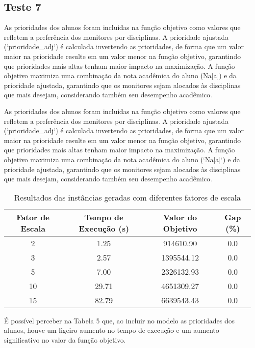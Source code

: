 \documentclass[a4paper,12pt]{article}
\begin{document}
\subsection{Teste 7}

As prioridades dos alunos foram incluídas na função objetivo como valores que refletem a preferência dos monitores por disciplinas. A prioridade ajustada (`prioridade\_adj`) é calculada invertendo as prioridades, de forma que um valor maior na prioridade resulte em um valor menor na função objetivo, garantindo que prioridades mais altas tenham maior impacto na maximização. A função objetivo maximiza uma combinação da nota acadêmica do aluno (Na[a]) e da prioridade ajustada, garantindo que os monitores sejam alocados às disciplinas que mais desejam, considerando também seu desempenho acadêmico.

As prioridades dos alunos foram incluídas na função objetivo como valores que refletem a preferência dos monitores por disciplinas. A prioridade ajustada (`prioridade\_adj`) é calculada invertendo as prioridades, de forma que um valor maior na prioridade resulte em um valor menor na função objetivo, garantindo que prioridades mais altas tenham maior impacto na maximização. A função objetivo maximiza uma combinação da nota acadêmica do aluno (`Na[a]`) e da prioridade ajustada, garantindo que os monitores sejam alocados às disciplinas que mais desejam, considerando também seu desempenho acadêmico.


\begin{table}[h!]
    \centering
    \begin{tabular}{|c|c|c|c|}
        \hline
        \textbf{Fator de Escala} & \textbf{Tempo de Execução (s)} & \textbf{Valor do Objetivo} & \textbf{Gap (\%)} \\
        \hline
        2 & 1.25 & 914610.90 & 0.0 \\
        3 & 2.57 & 1395544.12 & 0.0 \\
        5 & 7.00 & 2326132.93 & 0.0 \\
        10 & 29.71 & 4651309.27 & 0.0 \\
        15 & 82.79 & 6639543.43 & 0.0 \\
        \hline
    \end{tabular}
    \caption{Resultados das instâncias geradas com diferentes fatores de escala}
    \label{tab:resultados}
\end{table}

É possível perceber na Tabela 5 que, ao incluir no modelo as prioridades dos alunos, houve um ligeiro aumento no tempo de execução e um aumento significativo no valor da função objetivo.
\end{document}
